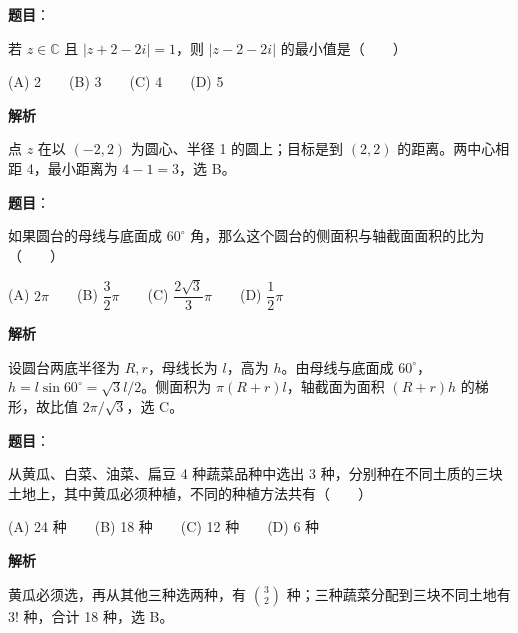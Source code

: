 \begin{answer}

\textbf{题目}：

若 \(z\in\mathbb C\) 且 \(|z+2-2i|=1\)，则 \(|z-2-2i|\) 的最小值是\mbox{（　　）}

   (A) 2　　(B) 3　　(C) 4　　(D) 5

\textbf{解析}

点 \(z\) 在以 \((-2,2)\) 为圆心、半径 1 的圆上；目标是到 \((2,2)\) 的距离。两中心相距 4，最小距离为 \(4-1=3\)，选 B。


\end{answer}
\begin{answer}

\textbf{题目}：

如果圆台的母线与底面成 \(60^\circ\) 角，那么这个圆台的侧面积与轴截面面积的比为\mbox{（　　）}

   (A) \(2\pi\)　　(B) \(\dfrac{3}{2}\pi\)　　(C) \(\dfrac{2\sqrt3}{3}\pi\)　　(D) \(\dfrac12\pi\)

\textbf{解析}

设圆台两底半径为 \(R,r\)，母线长为 \(l\)，高为 \(h\)。由母线与底面成 \(60^\circ\)，\(h=l\sin60^\circ=\sqrt3l/2\)。侧面积为 \(\pi(R+r)l\)，轴截面为面积 \((R+r)h\) 的梯形，故比值 \(2\pi/\sqrt3\)，选 C。


\end{answer}
\begin{answer}

\textbf{题目}：

从黄瓜、白菜、油菜、扁豆 4 种蔬菜品种中选出 3 种，分别种在不同土质的三块土地上，其中黄瓜必须种植，不同的种植方法共有\mbox{（　　）}

   (A) 24 种　　(B) 18 种　　(C) 12 种　　(D) 6 种

\textbf{解析}

黄瓜必须选，再从其他三种选两种，有 \(\binom32\) 种；三种蔬菜分配到三块不同土地有 \(3!\) 种，合计 18 种，选 B。


\end{answer}
